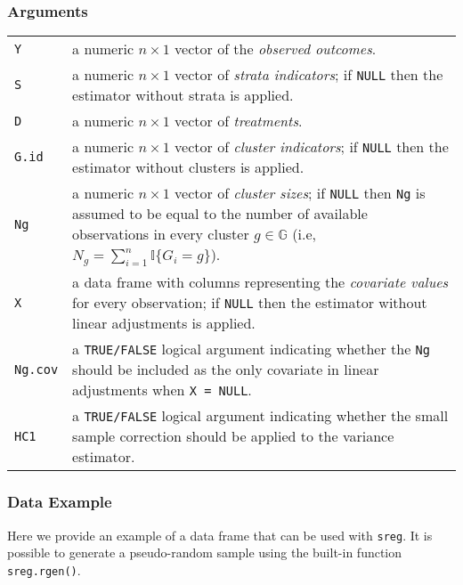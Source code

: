 \documentclass{article}
\makeatletter
\newenvironment{argdesc}{
    \par %
    \noindent %
    \normalfont %
    
    \begin{tabular}{@{}p{0.3\textwidth}p{0.6\textwidth}@{}} %
}{
    \end{tabular}
    \par %
   
}
\makeatother
\begin{document}
\subsubsection*{Arguments}
\begin{argdesc}
    \texttt{Y} & a numeric $n \times 1$ vector of the \textit{observed outcomes}. \\
    \texttt{S} & a numeric $n \times 1$ vector of \textit{strata indicators}; if \texttt{NULL} then the estimator without strata is applied. \\
    \texttt{D} & a numeric $n \times 1$ vector of \textit{treatments}. \\
    \texttt{G.id} & a numeric $n \times 1$ vector of \textit{cluster indicators}; if \texttt{NULL} then the estimator without clusters is applied. \\
    \texttt{Ng} & a numeric $n \times 1$ vector of \textit{cluster sizes}; if \texttt{NULL} then \texttt{Ng} is assumed to be equal to the number of available observations in every cluster $g \in \mathbb{G}$ (i.e, $N_g = \sum_{i = 1}^{n} \mathbb{I}\{G_{i} = g\}$). \\
    \texttt{X} & a data frame with columns representing the \textit{covariate values} for every observation; if \texttt{NULL} then the estimator without linear adjustments is applied. \\
    \texttt{Ng.cov} & a \texttt{TRUE/FALSE} logical argument indicating whether the \texttt{Ng} should be included as the only covariate in linear adjustments when \texttt{X = NULL}. \\
    \texttt{HC1} & a \texttt{TRUE/FALSE} logical argument indicating whether the small sample correction should be applied to the variance estimator. \\
\end{argdesc}

\subsubsection*{Data Example}
Here we provide an example of a data frame that can be used with \texttt{sreg}. It is possible to generate a pseudo-random sample using the built-in function \texttt{sreg.rgen()}.
\end{document}
